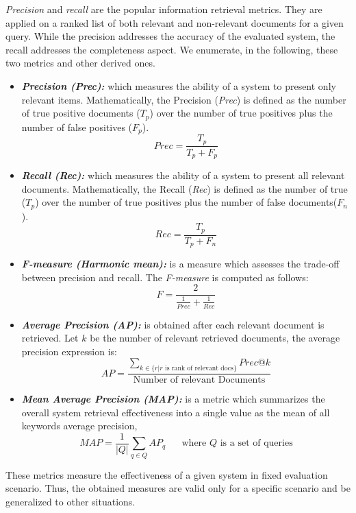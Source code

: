 		\emph{Precision} and \emph{recall} \citep{Buckland1994} are the popular information retrieval metrics. They are applied 
		on a ranked list of both relevant and non-relevant documents for a given query. While the precision 
		addresses the accuracy of the evaluated system, the recall addresses the completeness aspect.
		We enumerate, in the following, these two metrics and other derived ones.

		\begin{itemize}
			\item \textit{\textbf{Precision (Prec):}} which measures the ability of a
			system to present only relevant items. Mathematically, the Precision (\emph{Prec})
			is defined as the number of true positive documents ($T_{p}$) over the number of 
			true positives plus the number of false positives ($F_{p}$).
			\begin{equation}
				Prec = \frac{T_{p}}{T_{p} + F_{p}}
			\end{equation}

			\item \textit{\textbf{Recall (Rec):}} which measures the ability of a system
			to present all relevant documents.  Mathematically, the Recall (\emph{Rec}) is defined 
			as the number of true  ($T_{p}$) over the number of true positives 
			plus the number of false  documents($F_{n}$).
			\begin{equation}
				Rec =  \frac{T_{p}}{T_{p} + F_{n}}
			\end{equation}

			\item \textit{\textbf{F-measure (Harmonic mean):}} is a measure which assesses the
			trade-off between precision and recall. The \emph{F-measure} is computed as follows:
			\begin{equation}
				F =  \frac{2}{\frac{1}{Prec} + \frac{1}{Rec}}
			\end{equation}

			\item \textit{\textbf{Average Precision (AP):}} is obtained after each relevant 
			document is retrieved. Let $k$  be the number of relevant retrieved documents, the average 
			precision expression is:
			\begin{equation}
				AP = \frac{\sum\limits_{k\in \{r|r \text{ is rank of relevant docs}\}} 
					Prec@k}{\text{Number of relevant Documents}}
			\end{equation}

			\item \textit{\textbf{Mean Average Precision (MAP):}} is a metric which summarizes the
			overall system retrieval effectiveness into a single value as the mean of all 
			keywords average precision,
			\begin{equation}	
				MAP =  \frac{1}{|Q|} \sum_{q \in Q} AP_{q} \text{~~~~~where $Q$ is a set of queries}
			\end{equation}
		\end{itemize}
		These metrics measure the effectiveness of a given system in  fixed evaluation scenario. 
		Thus, the obtained measures are valid only for a specific scenario and  be generalized 
		to other situations.			

